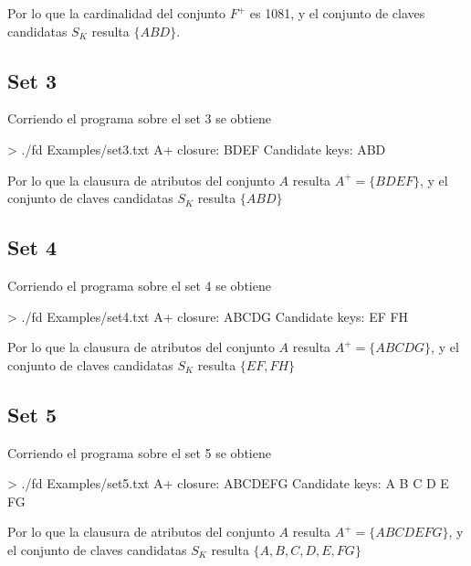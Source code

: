 \documentclass{article}
\begin{document}
Por lo que la cardinalidad del conjunto $F^{+}$ es 1081, y el conjunto de claves candidatas $S_{K}$ resulta $\{ABD\}$.


\subsection{Set 3}
Corriendo el programa sobre el set 3 se obtiene

\begin{commandshell}
> ./fd Examples/set3.txt
A+ closure: BDEF
Candidate keys:
ABD
\end{commandshell}

Por lo que la clausura de atributos del conjunto $A$ resulta $A^{+} = \{BDEF\}$, y el conjunto de claves candidatas $S_{K}$ resulta $\{ABD\}$


\subsection{Set 4}
Corriendo el programa sobre el set 4 se obtiene

\begin{commandshell}
> ./fd Examples/set4.txt
A+ closure: ABCDG
Candidate keys:
EF
FH
\end{commandshell}

Por lo que la clausura de atributos del conjunto $A$ resulta $A^{+} = \{ABCDG\}$, y el conjunto de claves candidatas $S_{K}$ resulta $\{EF,FH\}$


\subsection{Set 5}
Corriendo el programa sobre el set 5 se obtiene

\begin{commandshell}
> ./fd Examples/set5.txt
A+ closure: ABCDEFG
Candidate keys:
A
B
C
D
E
FG
\end{commandshell}

Por lo que la clausura de atributos del conjunto $A$ resulta $A^{+} = \{ABCDEFG\}$, y el conjunto de claves candidatas $S_{K}$ resulta $\{A,B,C,D,E,FG\}$


\nocite{*}


\end{document}
